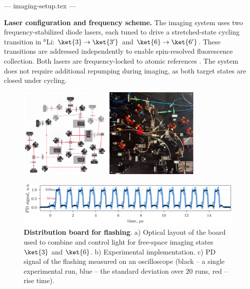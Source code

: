 --- imaging-setup.tex ---



\textbf{Laser configuration and frequency scheme.}  
The imaging system uses two frequency-stabilized diode lasers, each tuned to drive a stretched-state cycling transition in ${}^6$Li: $\ket{3} \rightarrow \ket{3'}$ and $\ket{6} \rightarrow \ket{6'}$. These transitions are addressed independently to enable spin-resolved fluorescence collection. Both lasers are frequency-locked to atomic references . The system does not require additional repumping during imaging, as both target states are closed under cycling.


\begin{figure}
    \centering
     \phantom{4}
    \includegraphics[width=0.4\textwidth]{fig-ai/flashing-distribution-scheme.pdf}
    \hspace{10 mm} 
     \phantom{4}
    \includegraphics[width=0.4\textwidth]{imgs/flashing-distribution-img.jpg}

    \includegraphics{fig-py/flashing-oscilloscope.pdf}

    \caption{
        \textbf{Distribution board for flashing}. 
        a) Optical layout of the board used to combine and control light for free-space imaging states $\ket{3}$ and $\ket{6}$.
        b) Experimental implementation.
        c) PD signal of the flashing measured on an oscilloscope (black -- a single experimental run, blue -- the standard deviation over 20 runs, red -- rise time).
    }
    \label{fig:flashing}
\end{figure}

